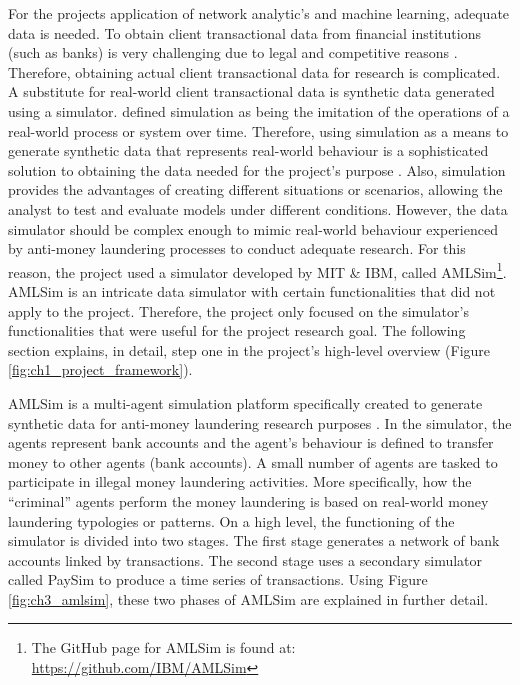 For the projects application of network analytic's and machine learning, adequate data is needed. To obtain client transactional data from financial institutions (such as banks) is very challenging due to legal and competitive reasons \citep*{watkins2003tracking}. Therefore, obtaining actual client transactional data for research is complicated. A substitute for real-world client transactional data is synthetic data generated using a simulator. \citet*{banks1998handbook} defined simulation as being the imitation of the operations of a real-world process or system over time. Therefore, using simulation as a means to generate synthetic data that represents real-world behaviour is a sophisticated solution to obtaining the data needed for the project's purpose \citep*{lopez2016applying}. Also, simulation provides the advantages of creating different situations or scenarios, allowing the analyst to test and evaluate models under different conditions. However, the data simulator should be complex enough to mimic real-world behaviour experienced by anti-money laundering processes to conduct adequate research. For this reason, the project used a simulator developed by MIT \& IBM, called AMLSim\footnote{The GitHub page for AMLSim is found at: \url{https://github.com/IBM/AMLSim}}. AMLSim is an intricate data simulator with certain functionalities that did not apply to the project. Therefore, the project only focused on the simulator's functionalities that were useful for the project research goal. The following section explains, in detail, step one in the project's high-level overview (Figure \ref{fig:ch1_project_framework}).

AMLSim is a multi-agent simulation platform specifically created to generate synthetic data for anti-money laundering research purposes \citep*{AMLSim}. In the simulator, the agents represent bank accounts and the agent's behaviour is defined to transfer money to other agents (bank accounts). A small number of agents are tasked to participate in illegal money laundering activities. More specifically, how the ``criminal'' agents perform the money laundering is based on real-world money laundering typologies or patterns. On a high level, the functioning of the simulator is divided into two stages. The first stage generates a network of bank accounts linked by transactions. The second stage uses a secondary simulator called PaySim to produce a time series of transactions. Using Figure \ref{fig:ch3_amlsim}, these two phases of AMLSim are explained in further detail.

